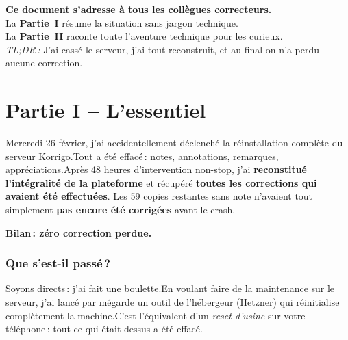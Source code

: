 \documentclass[11pt,a4paper]{article}
\begin{document}
\begin{center}
	\vspace{2.5cm}

	\begin{graybox}
		\centering\sffamily
		\textbf{Ce document s'adresse \`{a} tous les coll\`{e}gues correcteurs.}\\[6pt]
		La \textbf{Partie~I} r\'{e}sume la situation sans jargon technique.\\[2pt]
		La \textbf{Partie~II} raconte toute l'aventure technique pour les curieux.\\[6pt]
		{\small\color{gray} \textit{TL;DR\,:} J'ai cass\'{e} le serveur, j'ai tout reconstruit, et au final on n'a perdu aucune correction.}
	\end{graybox}
\end{center}

\newpage
\tableofcontents
\newpage

\part*{Partie I -- L'essentiel}
\vspace{0.3cm}

\begin{resumebox}
	Mercredi 26 f\'{e}vrier, j'ai accidentellement d\'{e}clench\'{e} la r\'{e}installation compl\`{e}te du serveur Korrigo.\@ Tout a \'{e}t\'{e} effac\'{e}\,: notes, annotations, remarques, appr\'{e}ciations.\@ Apr\`{e}s 48 heures d'intervention non-stop, j'ai \textbf{reconstitu\'{e} l'int\'{e}gralit\'{e} de la plateforme} et r\'{e}cup\'{e}r\'{e} \textbf{toutes les corrections qui avaient \'{e}t\'{e} effectu\'{e}es}. Les 59 copies restantes sans note n'avaient tout simplement \textbf{pas encore \'{e}t\'{e} corrig\'{e}es} avant le crash.

	\medskip
	\centerline{\large\bfseries\textcolor{vertOK}{Bilan\,: z\'{e}ro correction perdue.}}
\end{resumebox}

\section{Que s'est-il pass\'{e}\,?}

Soyons directs\,: j'ai fait une boulette.\@ En voulant faire de la maintenance sur le serveur, j'ai lanc\'{e} par m\'{e}garde un outil de l'h\'{e}bergeur (Hetzner) qui r\'{e}initialise compl\`{e}tement la machine.\@ C'est l'\'{e}quivalent d'un \textit{reset d'usine} sur votre t\'{e}l\'{e}phone\,: tout ce qui \'{e}tait dessus a \'{e}t\'{e} effac\'{e}.
\end{document}
